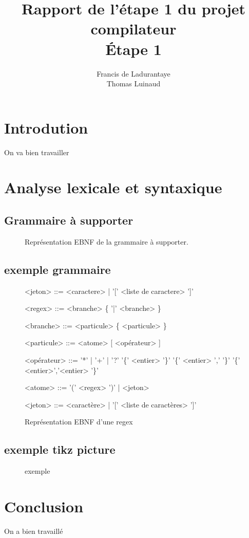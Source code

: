 \documentclass[]{article}
\title{Rapport de l'étape 1 du projet compilateur \\ Étape 1}
\author{Francis de Ladurantaye \\ Thomas Luinaud}
\begin{document}
\begin{titlepage}
	\maketitle
\end{titlepage}


\section{Introdution}
On va bien travailler

\section{Analyse lexicale et syntaxique}

\subsection{Grammaire à supporter}

\begin{figure}
	\centering
	
	\caption{Représentation EBNF de la grammaire à supporter.}
\end{figure}

\subsection{exemple grammaire}
\begin{figure}[]
	\begin{grammarC}{<jeton> ::= <caractere> | '[' <liste de caractere> ']'}
		
		<regex> ::= <branche> \{ '|' <branche> \}
		
		<branche> ::= <particule> \{ <particule> \}
		
		<particule> ::= <atome>  [ <opérateur> ]
		
		<opérateur> ::= '*' | '+' | '?' 
		\alt  '\{' <entier> '\}' 
		\alt  '\{' <entier> ',' '\}' 
		\alt '\{' <entier>','<entier>  '\}'
		
		<atome> ::= '(' <regex> ')' | <jeton>
		
		<jeton> ::= <caractère> | '[' <liste de caractères> ']'
		
	\end{grammarC}
	\caption{Représentation EBNF d'une regex}
\end{figure}


\subsection{exemple tikz picture}
\begin{figure}
	
	\caption{exemple}
\end{figure}


\section{Conclusion}
On a bien travaillé
\end{document}

